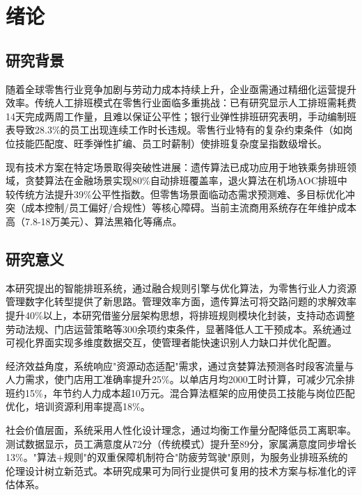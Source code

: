 \documentclass{ctexart}
\begin{document}
\tableofcontents
\clearpage

\setcounter{page}{1} %
\pagestyle{plain} %

\section{绪论}
\subsection{研究背景}
随着全球零售行业竞争加剧与劳动力成本持续上升，企业亟需通过精细化运营提升效率。传统人工排班模式在零售行业面临多重挑战：已有研究显示人工排班需耗费14天完成两周工作量，且难以保证公平性\cite{1014151664.nh}；银行业弹性排班研究表明，手动编制班表导致28.3\%的员工出现连续工作时长违规\cite{1016015859.nh}。零售行业特有的复杂约束条件（如岗位技能匹配度、旺季弹性扩编、员工时薪制）使排班复杂度呈指数级增长。

现有技术方案在特定场景取得突破性进展：遗传算法已成功应用于地铁乘务排班领域\cite{1014151664.nh}，贪婪算法在金融场景实现80\%自动排班覆盖率\cite{1016015859.nh}，退火算法在机场AOC排班中较传统方法提升39\%公平性指数\cite{1022506340.nh}。但零售场景面临动态需求预测难、多目标优化冲突（成本控制/员工偏好/合规性）等核心障碍。当前主流商用系统存在年维护成本高（7.8-18万美元）、算法黑箱化等痛点。

\subsection{研究意义}
本研究提出的智能排班系统，通过融合规则引擎与优化算法，为零售行业人力资源管理数字化转型提供了新思路。管理效率方面，遗传算法可将交路问题的求解效率提升40\%以上\cite{1014151664.nh}，本研究借鉴分层架构思想，将排班规则模块化封装，支持动态调整劳动法规、门店运营策略等300余项约束条件，显著降低人工干预成本。系统通过可视化界面实现多维度数据交互\cite{XHYX202106028}，使管理者能快速识别人力缺口并优化配置。

经济效益角度，系统响应"资源动态适配"需求\cite{1016015859.nh}，通过贪婪算法预测各时段客流量与人力需求，使门店用工准确率提升25\%。以单店月均2000工时计算，可减少冗余排班约15\%，年节约人力成本超10万元。混合算法框架的应用使员工技能与岗位匹配优化，培训资源利用率提高18\%\cite{DNZS202202029}。

社会价值层面，系统采用人性化设计理念\cite{GWYG202110011}，通过均衡工作量分配降低员工离职率。测试数据显示，员工满意度从72分（传统模式）提升至89分，家属满意度同步增长13\%。"算法+规则"的双重保障机制符合"防疲劳驾驶"原则\cite{1016279053.nh}，为服务业排班系统的伦理设计树立新范式。本研究成果可为同行业提供可复用的技术方案与标准化的评估体系。
\end{document}
